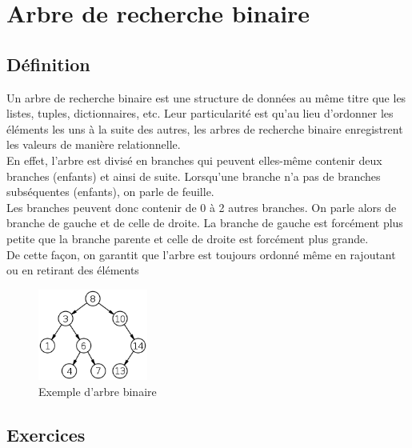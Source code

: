\newpage
\section{Arbre de recherche binaire}
\subsection{Définition}

Un arbre de recherche binaire est une structure de données au même titre que les listes, tuples, dictionnaires, etc. Leur particularité est qu'au lieu d'ordonner les éléments les uns à la suite des autres, les arbres de recherche binaire enregistrent les valeurs de manière relationnelle.\\

En effet, l'arbre est divisé en branches qui peuvent elles-même contenir deux branches (enfants) et ainsi de suite. Lorsqu'une branche n'a pas de branches subséquentes (enfants), on parle de feuille.\\

Les branches peuvent donc contenir de 0 à 2 autres branches. On parle alors de branche de gauche et de celle de droite. La branche de gauche est forcément plus petite que la branche parente et celle de droite est forcément plus grande.\\

De cette façon, on garantit que l'arbre est toujours ordonné même en rajoutant ou en retirant des éléments\\

\begin{figure}[h]
    \centering
    \includegraphics[width=0.32\textwidth]{img/binary-search-tree.png}
    \caption{Exemple d'arbre binaire}
\end{figure}

\subsection{Exercices}

